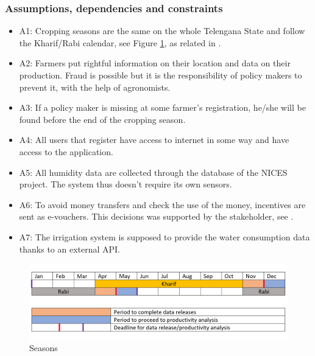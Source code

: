\subsubsection{Assumptions, dependencies and constraints}
\begin{itemize}
	\item
	A1: Cropping seasons are the same on the whole Telengana State and follow the Kharif/Rabi calendar, see Figure \ref{fig:seasons}, as related in \cite{seasons}.
	\item
	A2: Farmers put rightful information on their location and data on their production. Fraud is possible but it is the responsibility of policy makers to prevent it, with the help of agronomists.
	\item
	A3: If a policy maker is missing at some farmer's registration, he/she will be found before the end of the cropping season.
	\item
	A4: All users that register have access to internet in some way and have access to the application.
	\item
	A5: All humidity data are collected through the database of the NICES project. The system thus doesn't require its own sensors.
	\item
	A6: To avoid money transfers and check the use of the money, incentives are sent as e-vouchers. This decisions was supported by the stakeholder, see \cite{git}.
	\item
	A7: The irrigation system is supposed to provide the water consumption data thanks to an external API. 
	
\end{itemize}

\begin{figure}[H]
	
	\centering
	
	\includegraphics[width=\columnwidth]{Images/croping-seasons-calendar.png}
	
	\caption{Seasons}
	
	\label{fig:seasons}
	
\end{figure}


